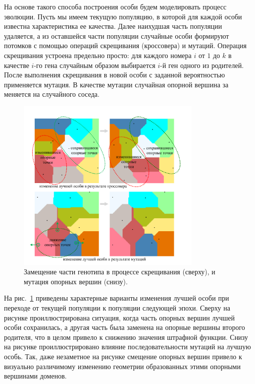 На основе такого способа построения особи будем моделировать процесс эволюции.
Пусть мы имеем текущую популяцию, в которой для каждой особи известна характеристика ее качества.
Далее наихудшая часть популяции удаляется, а из оставшейся части популяции случайные особи формируют потомков с помощью операций скрещивания (кроссовера) и мутаций.
Операция скрещивания устроена предельно просто: для каждого номера $i$ от $1$ до $k$ в качестве $i$-го гена случайным образом выбирается $i$-й ген одного из родителей.
После выполнения скрещивания в новой особи с заданной вероятностью применяется мутация.
В качестве мутации случайная опорной вершина за меняется на случайного соседа.

\begin{figure}[ht]
\centering
\includegraphics[width=0.8\textwidth]{fig/par_gen_changes.pdf}
\singlespacing
{}\caption{Замещение части генотипа в процессе скрещивания (сверху), и мутация опорных вершин (снизу).}
\label{fig:text_2_genetic_changes}
\end{figure}

На рис.~\ref{fig:text_2_genetic_changes} приведены характерные варианты изменения лучшей особи при переходе от текущей популяции к популяции следующей эпохи.
Сверху на рисунке проиллюстрирована ситуация, когда часть опорных вершин лучшей особи сохранилась, а другая часть была заменена на опорные вершины второго родителя, что в целом привело к снижению значения штрафной функции.
Снизу на рисунке проиллюстрировано влияние последовательности мутаций на лучшую особь.
Так, даже незаметное на рисунке смещение опорных вершин привело к визуально различимому изменению геометрии образованных этими опорными вершинами доменов.

